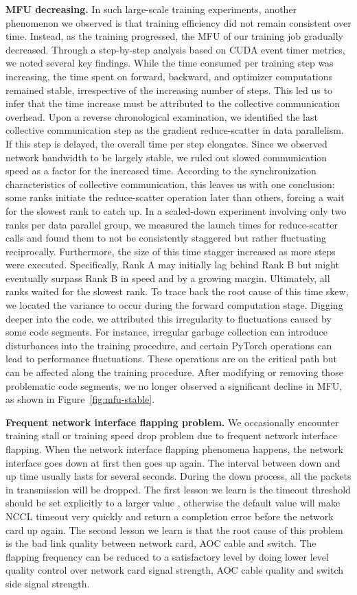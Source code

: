 \documentclass[letterpaper,twocolumn,10pt]{article}
\newcommand{\parabf}[1]{\medskip\noindent\textbf{#1}}
\newcommand{\revision}[1]{{#1}}
\begin{document}
\parabf{MFU decreasing.} In such large-scale training experiments, another phenomenon we observed is that training efficiency did not remain consistent over time. Instead, as the training progressed, the MFU of our training job gradually decreased. Through a step-by-step analysis based on CUDA event timer metrics, we noted several key findings. While the time consumed per training step was increasing, the time spent on forward, backward, and optimizer computations remained stable, irrespective of the increasing number of steps. This led us to infer that the time increase must be attributed to the collective communication overhead. Upon a reverse chronological examination, we identified the last collective communication step as the gradient reduce-scatter in data parallelism. If this step is delayed, the overall time per step elongates. Since we observed network bandwidth to be largely stable, we ruled out slowed communication speed as a factor for the increased time. According to the synchronization characteristics of collective communication, this leaves us with one conclusion: some ranks initiate the reduce-scatter operation later than others, forcing a wait for the slowest rank to catch up. In a scaled-down experiment involving only two ranks per data parallel group, we measured the launch times for reduce-scatter calls and found them to not be consistently staggered but rather fluctuating reciprocally. Furthermore, the size of this time stagger increased as more steps were executed. Specifically, Rank A may initially lag behind Rank B but might eventually surpass Rank B in speed and by a growing margin. Ultimately, all ranks waited for the slowest rank. To trace back the root cause of this time skew, we located the variance to occur during the forward computation stage. Digging deeper into the code, we attributed this irregularity to fluctuations caused by 
some code segments. \revision{For instance, irregular garbage collection can introduce disturbances into the training procedure, and certain PyTorch operations can lead to performance fluctuations. } These operations are on the critical path but can be affected along the training procedure. After modifying or removing those problematic code segments, we no longer observed a significant decline in MFU, as shown in Figure~\ref{fig:mfu-stable}.

\parabf{Frequent network interface flapping problem.} We occasionally encounter training stall or training speed drop problem due to frequent network interface flapping. When the network interface flapping phenomena happens, the network interface goes down at first then goes up again. The interval between down and up time usually lasts for several seconds. During the down process, all the packets in transmission will be dropped. The first lesson we learn is the timeout threshold should be set explicitly to a larger value , otherwise the default value will make NCCL timeout very quickly and return a completion error before the network card up again. The second lesson we learn is that the root cause of this problem is the bad link quality between network card, AOC cable and switch. The flapping frequency can be reduced to a satisfactory level by doing lower level quality control over network card signal strength, AOC cable quality and switch side signal strength. 
\end{document}
